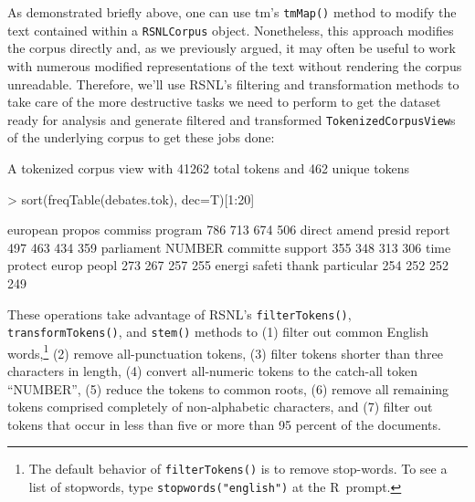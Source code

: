 \documentclass[11pt]{article}
\def\R{\textsf{R}}
\def\RSNL{{\normalfont\fontseries{b}\selectfont RSNL}}
\def\tm{{\normalfont\fontseries{b}\selectfont tm}}
\let\code=\texttt
\let\rclass=\texttt
\begin{document}
As demonstrated briefly above, one can use \tm's \code{tmMap()} method
to modify the text contained within a \rclass{RSNLCorpus} object.
Nonetheless, this approach modifies the corpus directly and, as we
previously argued, it may often be useful to work with numerous
modified representations of the text without rendering the corpus
unreadable.  Therefore, we'll use \RSNL's filtering and transformation
methods to take care of the more destructive tasks we need to perform
to get the dataset ready for analysis and generate filtered and transformed
\rclass{TokenizedCorpusView}s of the underlying corpus to get these
jobs done:
\begin{Schunk}
\begin{Soutput}
A tokenized corpus view with 41262 total tokens and 462 unique tokens
\end{Soutput}
\begin{Sinput}
> sort(freqTable(debates.tok), dec=T)[1:20]
\end{Sinput}
\begin{Soutput}
  european     propos    commiss    program 
       786        713        674        506 
    direct      amend     presid     report 
       497        463        434        359 
parliament     NUMBER   committe    support 
       355        348        313        306 
      time    protect      europ      peopl 
       273        267        257        255 
    energi     safeti      thank particular 
       254        252        252        249 
\end{Soutput}
\end{Schunk}
These operations take advantage of \RSNL's \code{filterTokens()},
\code{transformTokens()}, and \code{stem()} methods to (1) filter out
common English words,\footnote{The default behavior of
\code{filterTokens()} is to remove stop-words.  To see a list of
stopwords, type \code{stopwords("english")} at the \R\ prompt.} (2)
remove all-punctuation tokens, (3) filter tokens shorter than three
characters in length, (4) convert all-numeric tokens to the catch-all
token ``NUMBER'', (5) reduce the tokens to common roots, (6) remove
all remaining tokens comprised completely of non-alphabetic
characters, and (7) filter out tokens that occur in less than five or
more than 95 percent of the documents.
\end{document}
